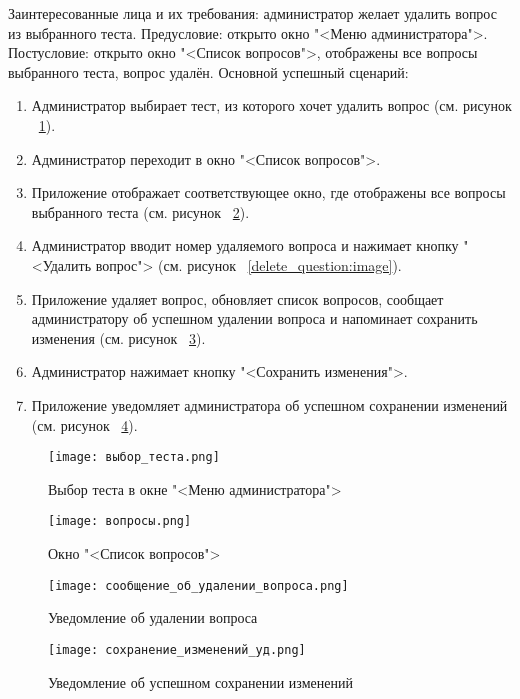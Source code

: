 Заинтересованные лица и их требования: администратор желает удалить вопрос из выбранного теста.
\newline Предусловие: открыто окно "<Меню администратора">.
\newline Постусловие: открыто окно "<Список вопросов">, отображены все вопросы выбранного теста, вопрос удалён.
\newline Основной успешный сценарий:
\begin{enumerate}
	\item Администратор выбирает тест, из которого хочет удалить вопрос (см. рисунок ~\ref{select_test:image}).
	\item Администратор переходит в окно "<Список вопросов">.
	\item Приложение отображает соответствующее окно, где отображены все вопросы выбранного теста (см. рисунок ~\ref{questions_window:image}).
	\item Администратор вводит номер удаляемого вопроса и нажимает кнопку "<Удалить вопрос"> (см. рисунок ~\ref{delete_question:image}).
	\item Приложение удаляет вопрос, обновляет список вопросов, сообщает администратору об успешном удалении вопроса и напоминает сохранить изменения (см. рисунок ~\ref{deleting_complete:image}).
	\item Администратор нажимает кнопку "<Сохранить изменения">.
	\item Приложение уведомляет администратора об успешном сохранении изменений (см. рисунок ~\ref{save_notification:image}).
\end{enumerate}

\begin{figure}[H]
	\centering
	\texttt{[image: выбор\_теста.png]}
	\caption{Выбор теста в окне "<Меню администратора">}
	\label{select_test:image}
\end{figure}
\begin{figure}[H]
	\centering
	\texttt{[image: вопросы.png]}
	\caption{Окно "<Список вопросов">}
	\label{questions_window:image}
\end{figure}
\begin{figure}[H]
	\centering
	\texttt{[image: сообщение\_об\_удалении\_вопроса.png]}
	\caption{Уведомление об удалении вопроса}
	\label{deleting_complete:image}
\end{figure}
\begin{figure}[H]
	\centering
	\texttt{[image: сохранение\_изменений\_уд.png]}
	\caption{Уведомление об успешном сохранении изменений}
	\label{save_notification:image}
\end{figure}

